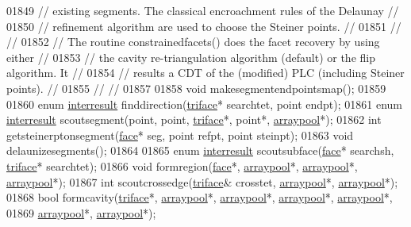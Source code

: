 \begin{DoxyCode}
01849 \textcolor{comment}{// existing segments.  The classical encroachment rules of the Delaunay      //}
01850 \textcolor{comment}{// refinement algorithm are used to choose the Steiner points.               //}
01851 \textcolor{comment}{//                                                                           //}
01852 \textcolor{comment}{// The routine constrainedfacets() does the facet recovery by using either   //}
01853 \textcolor{comment}{// the cavity re-triangulation algorithm (default) or the flip algorithm. It //}
01854 \textcolor{comment}{// results a CDT of the (modified) PLC (including Steiner points).           //}
01855 \textcolor{comment}{//                                                                           //}
01857 \textcolor{comment}{}
01858   \textcolor{keywordtype}{void} makesegmentendpointsmap();
01859 
01860   \textcolor{keyword}{enum} \hyperlink{classtetgenmesh_a01d2be902350e1bf8f20e650d687a793}{interresult} finddirection(\hyperlink{classtetgenmesh_1_1triface}{triface}* searchtet, point endpt);
01861   \textcolor{keyword}{enum} \hyperlink{classtetgenmesh_a01d2be902350e1bf8f20e650d687a793}{interresult} scoutsegment(point, point, \hyperlink{classtetgenmesh_1_1triface}{triface}*, point*, 
      \hyperlink{classtetgenmesh_1_1arraypool}{arraypool}*);
01862   \textcolor{keywordtype}{int}  getsteinerptonsegment(\hyperlink{classtetgenmesh_1_1face}{face}* seg, point refpt, point steinpt);
01863   \textcolor{keywordtype}{void} delaunizesegments();
01864 
01865   \textcolor{keyword}{enum} \hyperlink{classtetgenmesh_a01d2be902350e1bf8f20e650d687a793}{interresult} scoutsubface(\hyperlink{classtetgenmesh_1_1face}{face}* searchsh, \hyperlink{classtetgenmesh_1_1triface}{triface}* searchtet);
01866   \textcolor{keywordtype}{void} formregion(\hyperlink{classtetgenmesh_1_1face}{face}*, \hyperlink{classtetgenmesh_1_1arraypool}{arraypool}*, \hyperlink{classtetgenmesh_1_1arraypool}{arraypool}*, \hyperlink{classtetgenmesh_1_1arraypool}{arraypool}*);
01867   \textcolor{keywordtype}{int}  scoutcrossedge(\hyperlink{classtetgenmesh_1_1triface}{triface}& crosstet, \hyperlink{classtetgenmesh_1_1arraypool}{arraypool}*, \hyperlink{classtetgenmesh_1_1arraypool}{arraypool}*);
01868   \textcolor{keywordtype}{bool} formcavity(\hyperlink{classtetgenmesh_1_1triface}{triface}*, \hyperlink{classtetgenmesh_1_1arraypool}{arraypool}*, \hyperlink{classtetgenmesh_1_1arraypool}{arraypool}*, 
      \hyperlink{classtetgenmesh_1_1arraypool}{arraypool}*, \hyperlink{classtetgenmesh_1_1arraypool}{arraypool}*, 
01869                   \hyperlink{classtetgenmesh_1_1arraypool}{arraypool}*, \hyperlink{classtetgenmesh_1_1arraypool}{arraypool}*);

\end{DoxyCode}
